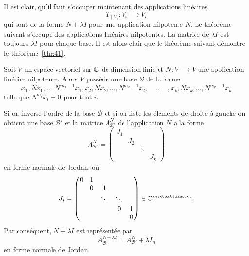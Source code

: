 Il est clair, qu'il faut s'occuper maintenant des applications linéaires 
\begin{displaymath}
  T_{∣V_i} \colon V_i ⟶ V_i 
\end{displaymath}
qui sont de la forme $N + λ I$ pour une application nilpotente $N$. Le théorème suivant s'occupe des applications linéaires nilpotentes. La matrice de $λI$ est toujours $λ I$ pour chaque base. Il est alors clair que le théorème suivant démontre le théorème~\ref{thr:41}. 

\begin{theorem}
  \label{thr:38}
  Soit $V$ un espace vectoriel sur $\mathbb{C}$ de dimension finie et $N\colon V ⟶V$  une application linéaire nilpotente.  Alors $V$ possède une base $ℬ$ de la forme 
  \begin{displaymath}
    x_1,Nx_1, \dots, N^{m_1-1}x_1, x_2,Nx_2, \ldots , N^{m_2-1}x_2, \quad \dots \quad , x_k,Nx_k, \dots, N^{m_k-1}x_k
  \end{displaymath}
telle que $N^{m_i}x_i = 0$ pour tout $i$. 
\end{theorem}

\begin{remark}
  \label{rem:4}
  Si on inverse l'ordre de la base $ℬ$ et si on liste les éléments de droite à gauche on obtient une base $ℬ'$ et la matrice $A_{ℬ'}^{N }$ de l'application $N$  a la forme 
  \begin{displaymath}
    A_{ℬ'}^N =
    \begin{pmatrix}
      J_1 \\
      & J_2 \\
      & & \ddots \\
      & & & J_k
    \end{pmatrix}
  \end{displaymath}
en forme normale de Jordan, où 
\begin{displaymath}
  J_i =
  \begin{pmatrix}
    0 & 1 \\
    &  0 & 1 \\
    &    & \ddots & \ddots \\
    &    &        & 0 & 1 \\
    & & & & 0
  \end{pmatrix} \in \C^{m_i × m_i}. 
\end{displaymath}
Par conséquent, $N+ λI$ est représentée par 
\begin{displaymath}
 A_{ℬ'}^{N + λI} =    A_{ℬ'}^N + λ I_n
\end{displaymath}
en forme normale de Jordan. 
\end{remark}


